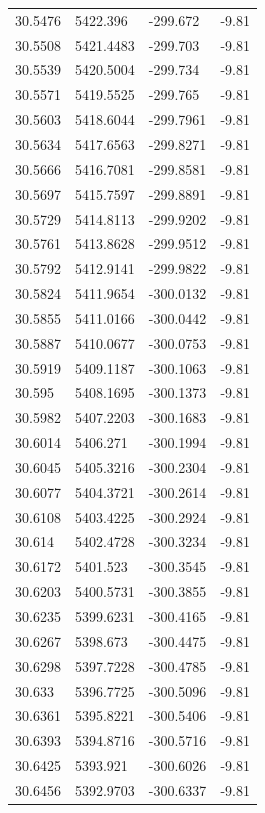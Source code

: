 \begin{table}[H]
\begin{tabular}{llll}
30.5476 & 5422.396 & -299.672 & -9.81 \\
30.5508 & 5421.4483 & -299.703 & -9.81 \\
30.5539 & 5420.5004 & -299.734 & -9.81 \\
30.5571 & 5419.5525 & -299.765 & -9.81 \\
30.5603 & 5418.6044 & -299.7961 & -9.81 \\
30.5634 & 5417.6563 & -299.8271 & -9.81 \\
30.5666 & 5416.7081 & -299.8581 & -9.81 \\
30.5697 & 5415.7597 & -299.8891 & -9.81 \\
30.5729 & 5414.8113 & -299.9202 & -9.81 \\
30.5761 & 5413.8628 & -299.9512 & -9.81 \\
30.5792 & 5412.9141 & -299.9822 & -9.81 \\
30.5824 & 5411.9654 & -300.0132 & -9.81 \\
30.5855 & 5411.0166 & -300.0442 & -9.81 \\
30.5887 & 5410.0677 & -300.0753 & -9.81 \\
30.5919 & 5409.1187 & -300.1063 & -9.81 \\
30.595 & 5408.1695 & -300.1373 & -9.81 \\
30.5982 & 5407.2203 & -300.1683 & -9.81 \\
30.6014 & 5406.271 & -300.1994 & -9.81 \\
30.6045 & 5405.3216 & -300.2304 & -9.81 \\
30.6077 & 5404.3721 & -300.2614 & -9.81 \\
30.6108 & 5403.4225 & -300.2924 & -9.81 \\
30.614 & 5402.4728 & -300.3234 & -9.81 \\
30.6172 & 5401.523 & -300.3545 & -9.81 \\
30.6203 & 5400.5731 & -300.3855 & -9.81 \\
30.6235 & 5399.6231 & -300.4165 & -9.81 \\
30.6267 & 5398.673 & -300.4475 & -9.81 \\
30.6298 & 5397.7228 & -300.4785 & -9.81 \\
30.633 & 5396.7725 & -300.5096 & -9.81 \\
30.6361 & 5395.8221 & -300.5406 & -9.81 \\
30.6393 & 5394.8716 & -300.5716 & -9.81 \\
30.6425 & 5393.921 & -300.6026 & -9.81 \\
30.6456 & 5392.9703 & -300.6337 & -9.81 \\

\end{tabular}
\end{table}
